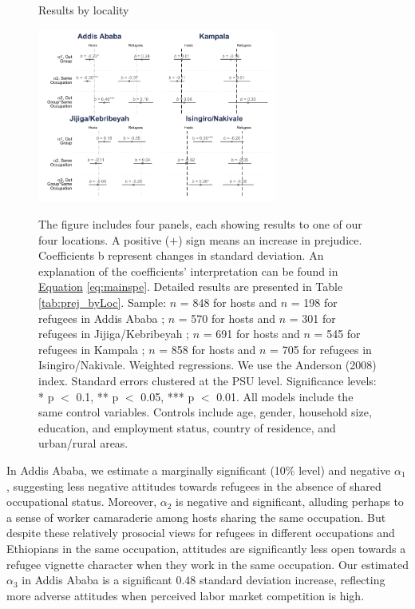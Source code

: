 \documentclass[a4paper,12pt]{article}
\renewcommand{\footnotesize}{\fontsize{8pt}{9pt}\selectfont}
\begin{document}
\begin{figure}[h]
    \centering
    \captionsetup{width=.7\linewidth}
    \caption{Results by locality}
    \includegraphics[width=0.7\textwidth]{Figures/FIG5_CFP_Analysis_byLocalities.pdf}
    \label{fig:mainpooledbyLoc}
 \caption*{
 \footnotesize
 The figure includes four panels, each showing results to one of our four locations. A positive ($+$) sign means an increase in prejudice. Coefficients b represent changes in standard deviation. An explanation of the coefficients' interpretation can be found in \hyperref[eq:mainspe]{Equation} \ref{eq:mainspe}. Detailed results are presented in Table \ref{tab:prej_byLoc}. Sample: $n$ = 848 for hosts and $n$ = 198 for refugees in Addis Ababa ; $n$ = 570 for hosts and $n$ = 301 for refugees in Jijiga/Kebribeyah ; $n$ = 691 for hosts and $n$ = 545 for refugees in Kampala ; $n$ = 858 for hosts and $n$ = 705 for refugees in Isingiro/Nakivale. Weighted regressions. We use the Anderson (2008) index. Standard errors clustered at the PSU level. Significance levels: * p $<$ 0.1, ** p $<$ 0.05, *** p $<$ 0.01. All models include the same control variables. Controls include age, gender, household size, education, and employment status, country of residence, and urban/rural areas.}

 \vspace{5mm}
 
\end{figure}

In Addis Ababa, we estimate a marginally significant (10\% level) and negative $\alpha_{1}$, suggesting less negative attitudes towards refugees in the absence of shared occupational status. Moreover, $\alpha_{2}$ is negative and significant, alluding perhaps to a sense of worker camaraderie among hosts sharing the same occupation. But despite these relatively prosocial views for refugees in different occupations and Ethiopians in the same occupation, attitudes are significantly less open towards a refugee vignette character when they work in the same occupation. Our estimated $\alpha_{3}$ in Addis Ababa is a significant $0.48$ standard deviation increase, reflecting more adverse attitudes when perceived labor market competition is high.
\end{document}

